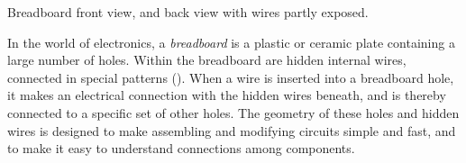 \begin{marginfigure}[-10.cm]
\begin{center}
		\caption[Breadboard front/back]{Breadboard front view, and back view with wires partly exposed.}
	\end{center}
\end{marginfigure}
In the world of electronics, a \emph{breadboard} is a plastic or ceramic plate containing a large number of holes. 
Within the breadboard are hidden internal wires, connected in special patterns (). 
When a wire is inserted into a breadboard hole, it makes an electrical connection with the hidden wires beneath, and is thereby connected to a specific set of other holes. %
The geometry of these holes and hidden wires is designed to make assembling and modifying circuits simple and fast, and to make it easy to understand connections among components. 

